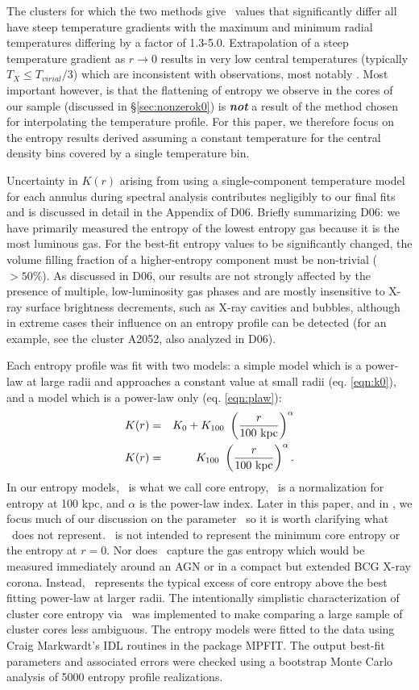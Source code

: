 \documentclass[12pt,preprint]{aastex}
\begin{document}
The clusters for which the two methods give \kna\ values that
significantly differ all have steep temperature gradients with the
maximum and minimum radial temperatures differing by a factor of
1.3-5.0. Extrapolation of a steep temperature gradient as $r
\rightarrow 0$ results in very low central temperatures (typically
$T_X \leq T_{virial}/3$) which are inconsistent with observations,
most notably \citet{peterson03}. Most important however, is that the
flattening of entropy we observe in the cores of our sample (discussed
in \S\ref{sec:nonzerok0}) is {\bfseries\em{not}} a result of the
method chosen for interpolating the temperature profile. For this
paper, we therefore focus on the entropy results derived assuming a
constant temperature for the central density bins covered by a single
temperature bin.

Uncertainty in $K(r)$ arising from using a single-component
temperature model for each annulus during spectral analysis
contributes negligibly to our final fits and is discussed in detail in
the Appendix of D06. Briefly summarizing D06: we have primarily
measured the entropy of the lowest entropy gas because it is the most
luminous gas. For the best-fit entropy values to be significantly
changed, the volume filling fraction of a higher-entropy component
must be non-trivial ($> 50\%$). As discussed in D06, our results are
not strongly affected by the presence of multiple, low-luminosity gas
phases and are mostly insensitive to X-ray surface brightness
decrements, such as X-ray cavities and bubbles, although in extreme
cases their influence on an entropy profile can be detected (for an
example, see the cluster A2052, also analyzed in D06).

Each entropy profile was fit with two models: a simple model which is
a power-law at large radii and approaches a constant value at small
radii (eq. \ref{eqn:k0}), and a model which is a power-law only
(eq. \ref{eqn:plaw}):
\begin{eqnarray}
K(r) &=& K_0 + K_{100}\ \left(\frac{r}{100 \mbox{\ensuremath{\mathrm{~kpc}}}}\right)^{\alpha}\label{eqn:k0}\\
K(r) &=& K_{100}\ \left(\frac{r}{100 \mbox{\ensuremath{\mathrm{~kpc}}}}\right)^{\alpha}\label{eqn:plaw}.
\end{eqnarray}
In our entropy models, \kna\ is what we call core entropy, \khun\ is a
normalization for entropy at 100 kpc, and $\alpha$ is the power-law
index. Later in this paper, and in \citet{haradent}, we focus much of
our discussion on the parameter \kna\ so it is worth clarifying what
\kna\ does not represent. \kna\ is not intended to represent the
minimum core entropy or the entropy at $r=0$. Nor does \kna\ capture
the gas entropy which would be measured immediately around an AGN or
in a compact but extended BCG X-ray corona. Instead, \kna\ represents
the typical excess of core entropy above the best fitting power-law at
larger radii. The intentionally simplistic characterization of cluster
core entropy via \kna\ was implemented to make comparing a large
sample of cluster cores less ambiguous. The entropy models were fitted
to the data using Craig Markwardt's IDL routines in the package
MPFIT. The output best-fit parameters and associated errors were
checked using a bootstrap Monte Carlo analysis of 5000 entropy
profile realizations.
\end{document}
